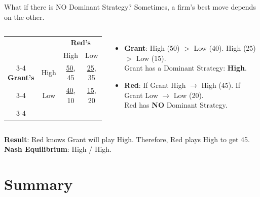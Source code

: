 \documentclass[aspectratio=169]{beamer}
\begin{document}
\begin{frame}{What if there is NO Dominant Strategy?}
    Sometimes, a firm's best move depends on the other.
    
    \begin{columns}
        \begin{center}
        \renewcommand{\arraystretch}{1.5}
        \scriptsize
        \begin{tabular}{cc|c|c|}
          & \multicolumn{1}{c}{} & \multicolumn{2}{c}{\textbf{Red's}} \\
          & \multicolumn{1}{c}{} & \multicolumn{1}{c}{High} & \multicolumn{1}{c}{Low} \\\cline{3-4}
          \textbf{Grant's} & High & \underline{50}, 45 & \underline{25}, 35 \\\cline{3-4}
                           & Low & \underline{40}, 10 & \underline{15}, 20 \\\cline{3-4}
        \end{tabular}
        \end{center}
        \begin{itemize}
            \item \textbf{Grant}: High (50) $>$ Low (40). High (25) $>$ Low (15). \\ Grant has a Dominant Strategy: \textbf{High}.
            \item \textbf{Red}: If Grant High $\to$ High (45). If Grant Low $\to$ Low (20). \\ Red has \textbf{NO} Dominant Strategy.
        \end{itemize}
    \end{columns}
    \vspace{0.5cm}
    \textbf{Result}: Red knows Grant will play High. Therefore, Red plays High to get 45. 
    \\ \textbf{Nash Equilibrium}: High / High.
\end{frame}

\section{Summary}
\end{document}

